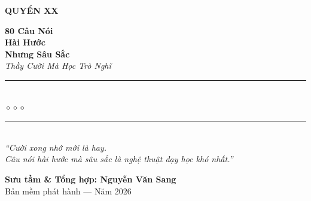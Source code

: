 \begin{titlepage}
\begin{center}
  \begin{tcolorbox}[
    width=6.5cm,
    colback=teal!20,
    colframe=teal!80!black,
    arc=4pt,
    boxrule=1.5pt,
    halign=center
  ]
    {\fontsize{18}{22}\selectfont\bfseries\color{inkdark!80!black}
     QUYỂN XX}
  \end{tcolorbox}
  \vspace{0.8cm}

  {\fontsize{28}{34}\selectfont\bfseries\color{inkdark!80!black}
    80 Câu Nói}\\[0.4cm]
  {\fontsize{28}{34}\selectfont\bfseries\color{teal!80!black}
    Hài Hước}\\[0.4cm]
  {\fontsize{28}{34}\selectfont\bfseries\color{inkdark!80!black}
    Nhưng Sâu Sắc}\\[0.4cm]

  {\fontsize{16}{20}\selectfont\color{teal!90!black}\itshape
    Thầy Cười Mà Học Trò Nghĩ}\\[1cm]

  {\color{warmorange!60}\rule{6cm}{1pt}}\\[5pt]
  {\color{teal!80!black}\large$\diamond$\hspace{1cm}$\diamond$\hspace{1cm}$\diamond$}\\[5pt]
  {\color{warmorange!60}\rule{6cm}{1pt}}\\[1.5cm]

  {\normalsize\itshape\color{warmorange!90!black}
   ``Cười xong nhớ mới là hay.\\
   Câu nói hài hước mà sâu sắc là nghệ thuật dạy học khó nhất.''}

  \vfill

  {\fontsize{16}{20}\selectfont\bfseries\color{warmorange!90!black}
    Sưu tầm \& Tổng hợp: \textbf{Nguyễn Văn Sang}}\\[0.4cm]

  {\small\color{gray} Bản mềm phát hành --- Năm 2026}\\[0.5cm]
\end{center}

\afterpage{\nopagecolor}
\end{titlepage}